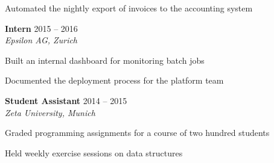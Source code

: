 \documentclass[10pt]{extarticle}
\newcommand{\role}[3]{%
  \textbf{#1} \hfill {\color{soft}\small #3}\\[-1pt]
  {\itshape\small #2}\par
}
\begin{document}
\begin{minipage}[t]{0.68\textwidth}
\begin{tightlist}
    \item Automated the nightly export of invoices to the accounting system

\end{tightlist}

\role{Intern}{Epsilon AG, Zurich}{2015 – 2016}

\begin{tightlist}
    \item Built an internal dashboard for monitoring batch jobs

    \item Documented the deployment process for the platform team

\end{tightlist}

\role{Student Assistant}{Zeta University, Munich}{2014 – 2015}

\begin{tightlist}
    \item Graded programming assignments for a course of two hundred students

    \item Held weekly exercise sessions on data structures

\end{tightlist}

\end{minipage}
\end{document}
